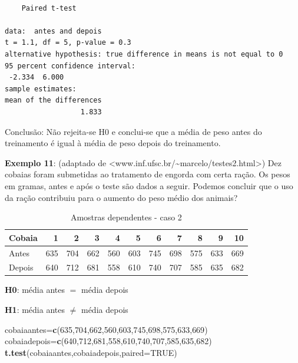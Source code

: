 \documentclass[12pt,brazil,oneside]{book}
\newenvironment{Shaded}{\begin{snugshade}}{\end{snugshade}}
\newcommand{\DataTypeTok}[1]{\textcolor[rgb]{0.13,0.29,0.53}{#1}}
\newcommand{\DecValTok}[1]{\textcolor[rgb]{0.00,0.00,0.81}{#1}}
\newcommand{\KeywordTok}[1]{\textcolor[rgb]{0.13,0.29,0.53}{\textbf{#1}}}
\newcommand{\NormalTok}[1]{#1}
\newcommand{\OtherTok}[1]{\textcolor[rgb]{0.56,0.35,0.01}{#1}}
\begin{document}
\begin{verbatim}

    Paired t-test

data:  antes and depois
t = 1.1, df = 5, p-value = 0.3
alternative hypothesis: true difference in means is not equal to 0
95 percent confidence interval:
 -2.334  6.000
sample estimates:
mean of the differences 
                  1.833 
\end{verbatim}

Conclusão: Não rejeita-se H0 e conclui-se que a média de peso antes do
treinamento é igual à média de peso depois do treinamento.

\textbf{Exemplo 11}: (adaptado de
\textless{}www.inf.ufsc.br/\textasciitilde{}marcelo/testes2.html\textgreater{})
Dez cobaias foram submetidas ao tratamento de engorda com certa ração.
Os pesos em gramas, antes e após o teste são dados a seguir. Podemos
concluir que o uso da ração contribuiu para o aumento do peso médio dos
animais?

\begin{table}

\caption{\label{tab:unnamed-chunk-110}Amostras dependentes - caso 2}
\centering
\begin{tabular}[t]{l|r|r|r|r|r|r|r|r|r|r}
\hline
Cobaia & 1 & 2 & 3 & 4 & 5 & 6 & 7 & 8 & 9 & 10\\
\hline
Antes & 635 & 704 & 662 & 560 & 603 & 745 & 698 & 575 & 633 & 669\\
\hline
Depois & 640 & 712 & 681 & 558 & 610 & 740 & 707 & 585 & 635 & 682\\
\hline
\end{tabular}
\end{table}

\textbf{H0}: média antes \(=\) média depois

\textbf{H1}: média antes \(\neq\) média depois

\begin{Shaded}
\begin{Highlighting}[]
\NormalTok{cobaiaantes=}\KeywordTok{c}\NormalTok{(}\DecValTok{635}\NormalTok{,}\DecValTok{704}\NormalTok{,}\DecValTok{662}\NormalTok{,}\DecValTok{560}\NormalTok{,}\DecValTok{603}\NormalTok{,}\DecValTok{745}\NormalTok{,}\DecValTok{698}\NormalTok{,}\DecValTok{575}\NormalTok{,}\DecValTok{633}\NormalTok{,}\DecValTok{669}\NormalTok{)}
\NormalTok{cobaiadepois=}\KeywordTok{c}\NormalTok{(}\DecValTok{640}\NormalTok{,}\DecValTok{712}\NormalTok{,}\DecValTok{681}\NormalTok{,}\DecValTok{558}\NormalTok{,}\DecValTok{610}\NormalTok{,}\DecValTok{740}\NormalTok{,}\DecValTok{707}\NormalTok{,}\DecValTok{585}\NormalTok{,}\DecValTok{635}\NormalTok{,}\DecValTok{682}\NormalTok{)}
\KeywordTok{t.test}\NormalTok{(cobaiaantes,cobaiadepois,}\DataTypeTok{paired=}\OtherTok{TRUE}\NormalTok{)}
\end{Highlighting}
\end{Shaded}
\end{document}
